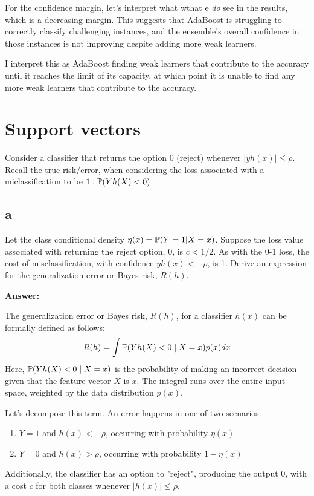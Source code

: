 \documentclass{article}
\begin{document}
For the confidence margin, let's interpret what wthat e \textit{do} see in the results, which is a decreasing margin.
This suggests that AdaBoost is struggling to correctly classify challenging instances, and the ensemble's overall confidence in those instances is not improving despite adding more weak learners.

I interpret this as AdaBoost finding weak learners that contribute to the accuracy until it reaches the limit of its capacity, at which point it is unable to find any more weak learners that contribute to the accuracy.

\section{Support vectors}

Consider a classifier that returns the option 0 (reject) whenever $|yh(x)| \leq \rho$.
Recall the true risk/error, when considering the loss associated with a miclassification to be $1 : \operatorname{\mathbb{P}}(Yh(X) < 0)$.

\subsection{a}
Let the class conditional density $\eta(x) = \operatorname{\mathbb{P}}(Y = 1|X=x)$.
Suppose the loss value associated with returning the reject option, 0, is $c < 1/2$.
As with the 0-1 loss, the cost of misclassification, with confidence $yh(x) < -\rho$, is 1.
Derive an expression for the generalization error or Bayes risk, $R(h)$.

\textbf{Answer:}

The generalization error or Bayes risk, \( R(h) \), for a classifier \( h(x) \) can be formally defined as follows:
$$R(h) = \int \operatorname{\mathbb{P}}(Y h(X) < 0 \mid X = x) p(x) dx$$
Here, \( \operatorname{\mathbb{P}}(Y h(X) < 0 \mid X = x) \) is the probability of making an incorrect decision given that the feature vector \( X \) is \( x \). The integral runs over the entire input space, weighted by the data distribution \( p(x) \).

Let's decompose this term. An error happens in one of two scenarios:
\begin{enumerate}
    \item \( Y = 1 \) and \( h(x) < -\rho \), occurring with probability \( \eta(x) \)
    \item \( Y = 0 \) and \( h(x) > \rho \), occurring with probability \( 1 - \eta(x) \)
\end{enumerate}
Additionally, the classifier has an option to "reject", producing the output 0, with a cost \( c \) for both classes whenever \( |h(x)| \leq \rho \).
\end{document}
